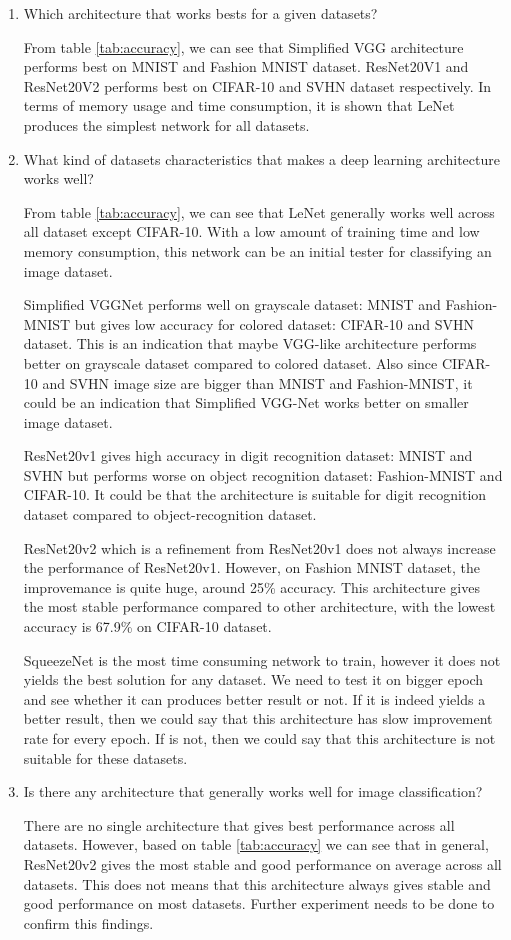 \begin{enumerate}
	\item Which architecture that works bests for a given datasets?
	
	From table \ref{tab:accuracy}, we can see that Simplified VGG architecture performs best on MNIST and Fashion MNIST dataset. ResNet20V1 and ResNet20V2 performs best on CIFAR-10 and SVHN dataset respectively. In terms of memory usage and time consumption, it is shown that LeNet produces the simplest network for all datasets.
	
	\item What kind of datasets characteristics that makes a deep learning architecture works well?
	
	From table \ref{tab:accuracy}, we can see that LeNet generally works well across all dataset except CIFAR-10. With a low amount of training time and low memory consumption, this network can be an initial tester for classifying an image dataset.
	
	Simplified VGGNet performs well on grayscale dataset: MNIST and Fashion-MNIST but gives low accuracy for colored dataset: CIFAR-10 and SVHN dataset. This is an indication that maybe VGG-like architecture performs better on grayscale dataset compared to colored dataset. Also since CIFAR-10 and SVHN image size are bigger than MNIST and Fashion-MNIST, it could be an indication that Simplified VGG-Net works better on smaller image dataset.
	
	ResNet20v1 gives high accuracy in digit recognition dataset: MNIST and SVHN but performs worse on object recognition dataset: Fashion-MNIST and CIFAR-10. It could be that the architecture is suitable for digit recognition dataset compared to object-recognition dataset.
	
	ResNet20v2 which is a refinement from ResNet20v1 does not always increase the performance of ResNet20v1. However, on Fashion MNIST dataset, the improvemance is quite huge, around 25\% accuracy. This architecture gives the most stable performance compared to other architecture, with the lowest accuracy is 67.9\% on CIFAR-10 dataset.
	
	SqueezeNet is the most time consuming network to train, however it does not yields the best solution for any dataset. We need to test it on bigger epoch and see whether it can produces better result or not. If it is indeed yields a better result, then we could say that this architecture has slow improvement rate for every epoch. If is not, then we could say that this architecture is not suitable for these datasets.
	
	\item Is there any architecture that generally works well for image classification?
	
	There are no single architecture that gives best performance across all datasets. However, based on table \ref{tab:accuracy} we can see that in general, ResNet20v2 gives the most stable and good performance on average across all datasets. This does not means that this architecture always gives stable and good performance on most datasets. Further experiment needs to be done to confirm this findings.
	
		
\end{enumerate}

